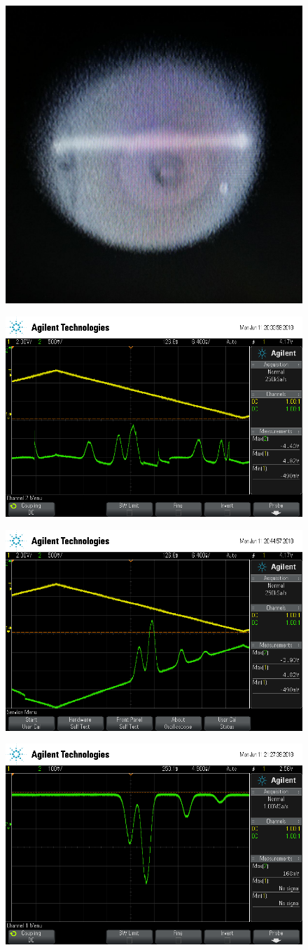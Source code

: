 \begin{figure}[h]
		\centering
		\includegraphics[width=0.4\linewidth]{./content/pictures/fluorescence.jpg}
		\caption{}
		\label{fig:}
\end{figure}

\begin{figure}[h]
		\centering
		\includegraphics[width=0.8\linewidth]{./content/pictures/scope_136.png}
		\caption{}
		\label{fig:}
\end{figure}

\begin{figure}[h]
		\centering
		\includegraphics[width=0.8\linewidth]{./content/pictures/scope_139.png}
		\caption{}
		\label{fig:}
\end{figure}

\begin{figure}[ht]
		\centering
		\includegraphics[width=0.8\linewidth]{./content/pictures/scope_140.png}
		\caption{}
		\label{fig:name}
\end{figure}
